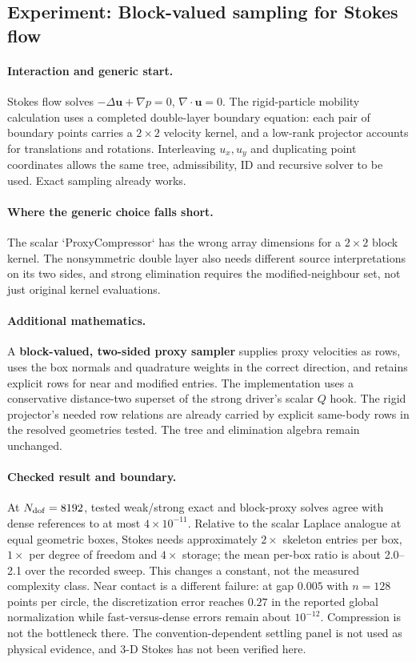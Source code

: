 \subsection{Experiment: Block-valued sampling for Stokes flow}
\label{exp:e6}
\paragraph{Interaction and generic start.} Stokes flow solves $-\Delta\mathbf u+\nabla p=0$, $\nabla\cdot\mathbf u=0$. The rigid-particle mobility calculation uses a completed double-layer boundary equation: each pair of boundary points carries a $2\times2$ velocity kernel, and a low-rank projector accounts for translations and rotations. Interleaving $u_x,u_y$ and duplicating point coordinates allows the same tree, admissibility, ID and recursive solver to be used. Exact sampling already works.

\paragraph{Where the generic choice falls short.} The scalar `ProxyCompressor` has the wrong array dimensions for a $2\times2$ block kernel. The nonsymmetric double layer also needs different source interpretations on its two sides, and strong elimination requires the modified-neighbour set, not just original kernel evaluations.

\paragraph{Additional mathematics.} A \textbf{block-valued, two-sided proxy sampler} supplies proxy velocities as rows, uses the box normals and quadrature weights in the correct direction, and retains explicit rows for near and modified entries. The implementation uses a conservative distance-two superset of the strong driver's scalar $Q$ hook. The rigid projector's needed row relations are already carried by explicit same-body rows in the resolved geometries tested. The tree and elimination algebra remain unchanged.

\paragraph{Checked result and boundary.} At $N_{\rm dof}=8192$, tested weak/strong exact and block-proxy solves agree with dense references to at most $4\times10^{-11}$. Relative to the scalar Laplace analogue at equal geometric boxes, Stokes needs approximately $2\times$ skeleton entries per box, $1\times$ per degree of freedom and $4\times$ storage; the mean per-box ratio is about 2.0--2.1 over the recorded sweep. This changes a constant, not the measured complexity class. Near contact is a different failure: at gap $0.005$ with $n=128$ points per circle, the discretization error reaches $0.27$ in the reported global normalization while fast-versus-dense errors remain about $10^{-12}$. Compression is not the bottleneck there. The convention-dependent settling panel is not used as physical evidence, and 3-D Stokes has not been verified here.

